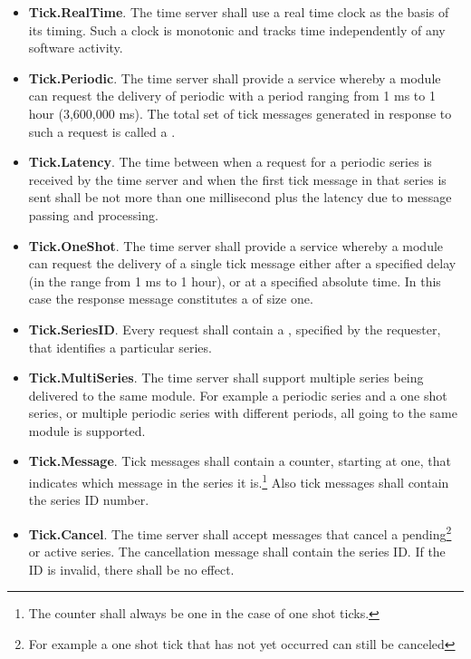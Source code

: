 \begin{itemize}
\item \textbf{Tick.RealTime}. The time server shall use a real time clock as the basis of its
  timing. Such a clock is monotonic and tracks time independently of any software activity.
\item \textbf{Tick.Periodic}. The time server shall provide a service whereby a module can
  request the delivery of periodic  with a period ranging from 1 ms to 1
  hour (3,600,000 ms). The total set of tick messages generated in response to such a request is
  called a .
\item \textbf{Tick.Latency}. The time between when a request for a periodic series is received
  by the time server and when the first tick message in that series is sent shall be not more
  than one millisecond plus the latency due to message passing and processing.
\item \textbf{Tick.OneShot}. The time server shall provide a service whereby a module can
  request the delivery of a single tick message either after a specified delay (in the range
  from 1 ms to 1 hour), or at a specified absolute time. In this case the response message
  constitutes a  of size one.
\item \textbf{Tick.SeriesID}. Every request shall contain a , specified by
  the requester, that identifies a particular series.
\item \textbf{Tick.MultiSeries}. The time server shall support multiple series being
  delivered to the same module. For example a periodic series and a one shot series, or multiple
  periodic series with different periods, all going to the same module is supported.
\item \textbf{Tick.Message}. Tick messages shall contain a counter, starting at one, that
  indicates which message in the series it is.\footnote{The counter shall always be one in the
    case of one shot ticks.} Also tick messages shall contain the series ID number.
\item \textbf{Tick.Cancel}. The time server shall accept messages that cancel a
  pending\footnote{For example a one shot tick that has not yet occurred can still be canceled}
  or active series. The cancellation message shall contain the series ID. If the ID is invalid,
  there shall be no effect. 
\end{itemize}

